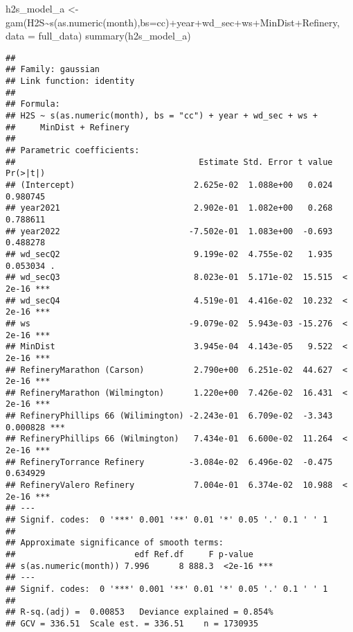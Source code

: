 \documentclass[
]{article}
\newenvironment{Shaded}{\begin{snugshade}}{\end{snugshade}}
\newcommand{\AttributeTok}[1]{\textcolor[rgb]{0.77,0.63,0.00}{#1}}
\newcommand{\FunctionTok}[1]{\textcolor[rgb]{0.00,0.00,0.00}{#1}}
\newcommand{\NormalTok}[1]{#1}
\newcommand{\OtherTok}[1]{\textcolor[rgb]{0.56,0.35,0.01}{#1}}
\newcommand{\SpecialCharTok}[1]{\textcolor[rgb]{0.00,0.00,0.00}{#1}}
\newcommand{\StringTok}[1]{\textcolor[rgb]{0.31,0.60,0.02}{#1}}
\begin{document}
\begin{Shaded}
\begin{Highlighting}[]
\NormalTok{h2s\_model\_a }\OtherTok{\textless{}{-}} \FunctionTok{gam}\NormalTok{(H2S}\SpecialCharTok{\textasciitilde{}}\FunctionTok{s}\NormalTok{(}\FunctionTok{as.numeric}\NormalTok{(month),}\AttributeTok{bs=}\StringTok{\textquotesingle{}cc\textquotesingle{}}\NormalTok{)}\SpecialCharTok{+}\NormalTok{year}\SpecialCharTok{+}\NormalTok{wd\_sec}\SpecialCharTok{+}\NormalTok{ws}\SpecialCharTok{+}\NormalTok{MinDist}\SpecialCharTok{+}\NormalTok{Refinery, }\AttributeTok{data =}\NormalTok{ full\_data)}
\FunctionTok{summary}\NormalTok{(h2s\_model\_a)}
\end{Highlighting}
\end{Shaded}

\begin{verbatim}
## 
## Family: gaussian 
## Link function: identity 
## 
## Formula:
## H2S ~ s(as.numeric(month), bs = "cc") + year + wd_sec + ws + 
##     MinDist + Refinery
## 
## Parametric coefficients:
##                                     Estimate Std. Error t value Pr(>|t|)    
## (Intercept)                        2.625e-02  1.088e+00   0.024 0.980745    
## year2021                           2.902e-01  1.082e+00   0.268 0.788611    
## year2022                          -7.502e-01  1.083e+00  -0.693 0.488278    
## wd_secQ2                           9.199e-02  4.755e-02   1.935 0.053034 .  
## wd_secQ3                           8.023e-01  5.171e-02  15.515  < 2e-16 ***
## wd_secQ4                           4.519e-01  4.416e-02  10.232  < 2e-16 ***
## ws                                -9.079e-02  5.943e-03 -15.276  < 2e-16 ***
## MinDist                            3.945e-04  4.143e-05   9.522  < 2e-16 ***
## RefineryMarathon (Carson)          2.790e+00  6.251e-02  44.627  < 2e-16 ***
## RefineryMarathon (Wilmington)      1.220e+00  7.426e-02  16.431  < 2e-16 ***
## RefineryPhillips 66 (Wilimington) -2.243e-01  6.709e-02  -3.343 0.000828 ***
## RefineryPhillips 66 (Wilmington)   7.434e-01  6.600e-02  11.264  < 2e-16 ***
## RefineryTorrance Refinery         -3.084e-02  6.496e-02  -0.475 0.634929    
## RefineryValero Refinery            7.004e-01  6.374e-02  10.988  < 2e-16 ***
## ---
## Signif. codes:  0 '***' 0.001 '**' 0.01 '*' 0.05 '.' 0.1 ' ' 1
## 
## Approximate significance of smooth terms:
##                        edf Ref.df     F p-value    
## s(as.numeric(month)) 7.996      8 888.3  <2e-16 ***
## ---
## Signif. codes:  0 '***' 0.001 '**' 0.01 '*' 0.05 '.' 0.1 ' ' 1
## 
## R-sq.(adj) =  0.00853   Deviance explained = 0.854%
## GCV = 336.51  Scale est. = 336.51    n = 1730935
\end{verbatim}
\end{document}
